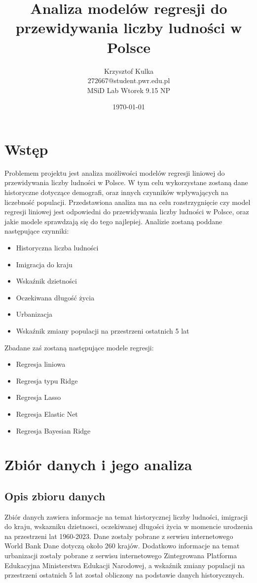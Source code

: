 \documentclass[11pt]{article}
\title{ Analiza modelów regresji do przewidywania liczby ludności w Polsce}
\author{ Krzysztof Kulka
        \\ 272667@student.pwr.edu.pl \\ MSiD Lab Wtorek 9.15 NP }
\date{\today}
\begin{document}
\maketitle	
\pagebreak

\tableofcontents
 \pagebreak


\section{Wstęp}
Problemem projektu jest analiza możliwości modelów regresji liniowej do przewidywania liczby ludności w Polsce. W tym celu wykorzystane zostaną dane historyczne dotyczące demografi, oraz innych czynników wpływających na liczebność populacji.
Przedstawiona analiza ma na celu rozstrzygnięcie czy model regresji liniowej jest odpowiedni do przewidywania liczby ludności w Polsce, oraz jakie modele sprawdzają się do tego najlepiej.
Analizie zostaną poddane następujące czynniki:
\begin{itemize}
\item Historyczna liczba ludności
\item Imigracja do kraju
\item Wskaźnik dzietności
\item Oczekiwana długość życia
\item Urbanizacja
\item Wskaźnik zmiany populacji na przestrzeni ostatnich 5 lat
\end{itemize}
Zbadane zaś zostaną następujące modele regresji:
\begin{itemize}
\item Regresja liniowa
\item Regresja typu Ridge
\item Regresja Lasso
\item Regresja Elastic Net
\item Regresja Bayesian Ridge
\end{itemize}
\section{Zbiór danych i jego analiza}
\subsection*{Opis zbioru danych}
Zbiór danych zawiera informacje na temat historycznej liczby ludności, imigracji do kraju, wskazniku dzietnosci, oczekiwanej długości życia w momencie urodzenia na przestrzeni lat 1960-2023.
Dane zostały pobrane z serwisu internetowego World Bank\cite{wbd} Dane dotyczą około 260 krajów. 
Dodatkowo informacje na temat urbanizacji
zostały pobrane z serwisu internetowego Zintegrowana Platforma Edukacyjna Ministerstwa Edukacji Narodowej\cite{zpe}, a wskaźnik zmiany populacji na przestrzeni ostatnich 5 lat został obliczony na podstawie danych historycznych.
\end{document}
